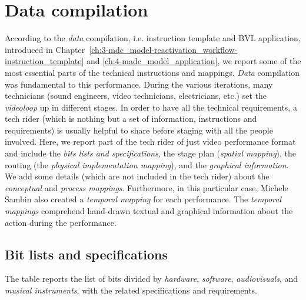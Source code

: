 \section{Data compilation}
According to the \textit{data} compilation, i.e. instruction template and BVL application, introduced in Chapter~\ref{ch:3-mdc_model-reactivation_workflow-instruction_template} and \ref{ch:4-madc_model_application}, we report some of the most essential parts of the technical instructions and mappings. \textit{Data} compilation was fundamental to this performance. During the various iterations, many technicians (sound engineers, video technicians, electricians, etc.) set the \textit{videoloop} up in different stages. In order to have all the technical requirements, a tech rider (which is nothing but a set of information, instructions and requirements) is usually helpful to share before staging with all the people involved. Here, we report part of the tech rider of just video performance format and include the \textit{bits lists and specifications}, the stage plan (\textit{spatial mapping}), the routing (the \textit{physical implementation mapping}), and the \textit{graphical information}. We add some details (which are not included in the tech rider) about the \textit{conceptual} and \textit{process mappings}. Furthermore, in this particular case, Michele Sambin also created a \textit{temporal mapping} for each performance. The \textit{temporal mappings} comprehend hand-drawn textual and graphical information about the action during the performance.

\subsection*{Bit lists and specifications}
The table reports the list of bits divided by \textit{hardware}, \textit{software}, \textit{audiovisuals}, and \textit{musical instruments}, with the related specifications and requirements.

